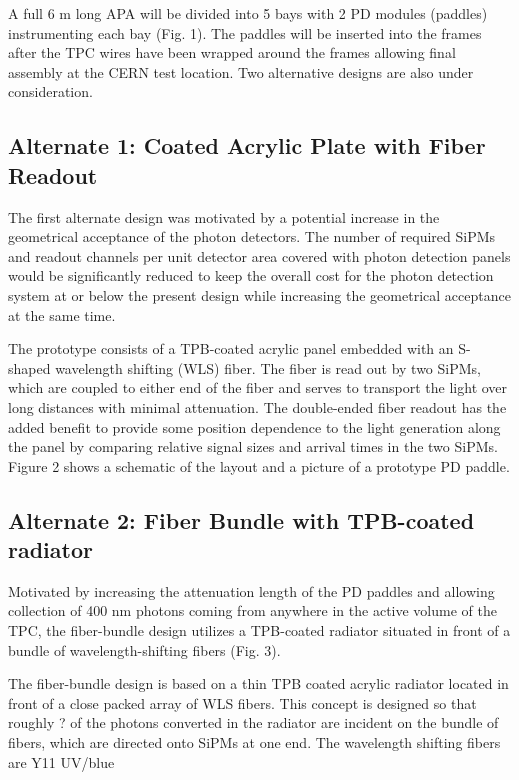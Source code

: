 A full 6 m long APA will be divided into 5 bays with 2 PD modules (paddles) instrumenting each bay (Fig.  1). The paddles will be inserted into the frames after the TPC wires have been wrapped around the frames allowing  final assembly at the CERN test location. Two alternative designs are also under consideration. 

\subsection{Alternate 1: Coated Acrylic Plate with Fiber Readout}

The first alternate design was motivated by a potential increase in the geometrical acceptance of the photon detectors. The number of required SiPMs and readout channels per unit detector area covered with photon detection panels would be significantly reduced to keep the overall cost for the photon detection system at or below the present design while increasing the geometrical acceptance at the same time.

The prototype consists of a TPB-coated acrylic panel embedded with an S-shaped wavelength shifting (WLS) fiber. The fiber is read out by two SiPMs, which are coupled to either end of the fiber and serves to transport the light over long distances with minimal attenuation. The double-ended fiber readout has the added benefit to provide some position dependence to the light generation along the panel by comparing relative signal sizes and arrival times in the two SiPMs. Figure 2 shows a schematic of the layout and a picture of a prototype PD paddle.

\subsection{Alternate 2: Fiber Bundle with TPB-coated radiator}

Motivated by increasing the attenuation length of the PD paddles and allowing collection of 400 nm photons coming from anywhere in the active volume of the TPC, the fiber-bundle design utilizes a TPB-coated radiator situated in front of a bundle of wavelength-shifting fibers (Fig. 3).  

The fiber-bundle design is based on a thin TPB coated acrylic radiator located in front of a close packed array of WLS fibers. This concept is designed so that roughly ? of the photons converted in the radiator are incident on the bundle of fibers, which are directed onto SiPMs at one end. The wavelength shifting fibers are Y11 UV/blue 

